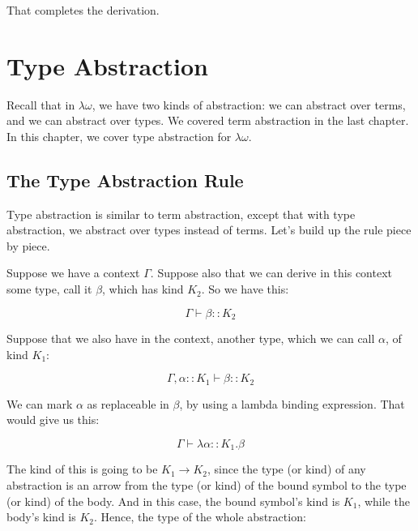 \documentclass{book}
\numberwithin{equation}{chapter}
\begin{document}
\noindent
That completes the derivation.


\chapter{Type Abstraction}

Recall that in $\lambda\omega$, we have two kinds of abstraction: we can abstract over terms, and we can abstract over types. We covered term abstraction in the last chapter. In this chapter, we cover type abstraction for $\lambda\omega$.


\section{The Type Abstraction Rule}

Type abstraction is similar to term abstraction, except that with type abstraction, we abstract over types instead of terms. Let's build up the rule piece by piece.

Suppose we have a context $\Gamma$. Suppose also that we can derive in this context some type, call it $\beta$, which has kind $K_{2}$. So we have this:

\begin{equation}
\Gamma \vdash \beta :: K_{2}
\end{equation}

\noindent
Suppose that we also have in the context, another type, which we can call $\alpha$, of kind $K_{1}$:

\begin{equation}
\Gamma, \alpha :: K_{1} \vdash \beta :: K_{2}
\end{equation}

\noindent
We can mark $\alpha$ as replaceable in $\beta$, by using a lambda binding expression. That would give us this:

\begin{equation}
\Gamma \vdash \lambda \alpha :: K_{1}.\beta
\end{equation}

\noindent
The kind of this is going to be $K_{1} \rightarrow K_{2}$, since the type (or kind) of any abstraction is an arrow from the type (or kind) of the bound symbol to the type (or kind) of the body. And in this case, the bound symbol's kind is $K_{1}$, while the body's kind is $K_{2}$. Hence, the type of the whole abstraction:
\end{document}
